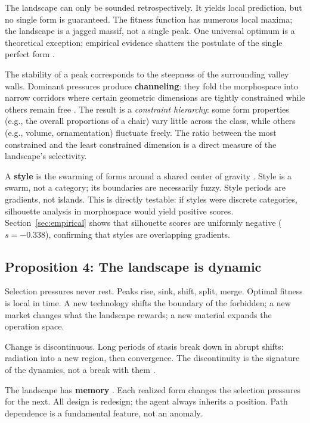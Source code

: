 The landscape can only be sounded retrospectively. It yields local prediction, but no single form is guaranteed. The fitness function has numerous local maxima; the landscape is a jagged massif, not a single peak. One universal optimum is a theoretical exception; empirical evidence shatters the postulate of the single perfect form \parencite{Kauffman1993}.

The stability of a peak corresponds to the steepness of the surrounding valley walls. Dominant pressures produce \textbf{channeling}: they fold the morphospace into narrow corridors where certain geometric dimensions are tightly constrained while others remain free \parencite{Waddington1957}. The result is a \textit{constraint hierarchy}: some form properties (e.g., the overall proportions of a chair) vary little across the class, while others (e.g., volume, ornamentation) fluctuate freely. The ratio between the most constrained and the least constrained dimension is a direct measure of the landscape's selectivity.

A \textbf{style} is the swarming of forms around a shared center of gravity \parencite{Kubler1962}. Style is a swarm, not a category; its boundaries are necessarily fuzzy. Style periods are gradients, not islands. This is directly testable: if styles were discrete categories, silhouette analysis in morphospace would yield positive scores. Section~\ref{sec:empirical} shows that silhouette scores are uniformly negative ($s = -0.338$), confirming that styles are overlapping gradients.

\subsection{Proposition 4: The landscape is dynamic}
\label{sec:prop4}

Selection pressures never rest. Peaks rise, sink, shift, split, merge. Optimal fitness is local in time. A new technology shifts the boundary of the forbidden; a new market changes what the landscape rewards; a new material expands the operation space.

Change is discontinuous. Long periods of stasis break down in abrupt shifts: radiation into a new region, then convergence. The discontinuity is the signature of the dynamics, not a break with them \parencite{ElredgeGould1972}.

The landscape has \textbf{memory} \parencite{Arthur1994}. Each realized form changes the selection pressures for the next. All design is redesign; the agent always inherits a position. Path dependence is a fundamental feature, not an anomaly.

